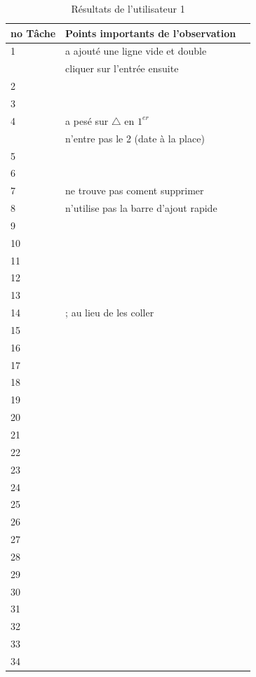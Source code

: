\documentclass[letterpaper, oneside, 12pt, these, creativecommons]{thETS}
\begin{document}
\begin{table}
	\centering
	\begin{tabular}{|l|l|l|}
	\hline
	no Tâche	& Points importants de l'observation	\\ \hline \hline
	1		& a ajouté une ligne vide et double	\\ 
			& cliquer sur l'entrée ensuite		\\ \hline
	2		& 						\\ \hline
	3		& 						\\ \hline
	4		& a pesé sur	$\bigtriangleup$ en $1^{er}$ \\
			& n'entre pas le 2 (date à la place)	\\ \hline
	5		& 						\\ \hline
	6		& 						\\ \hline
	7		& ne trouve pas coment supprimer	\\ \hline
	8		& n'utilise pas la barre d'ajout rapide	\\ \hline
	9		& 						\\ \hline
	10		& 						\\ \hline
	11		& 						\\ \hline
	12		& 						\\ \hline
	13		& 						\\ \hline
	14		& ; au lieu de les coller			\\ \hline
	15		& 						\\ \hline
	16		& 						\\ \hline
	17		& 						\\ \hline
	18		& 						\\ \hline
	19		& 						\\ \hline
	20		& 						\\ \hline
	21		& 						\\ \hline
	22		& 						\\ \hline
	23		& 						\\ \hline
	24		& 						\\ \hline
	25		& 						\\ \hline
	26		& 						\\ \hline
	27		& 						\\ \hline
	28		& 						\\ \hline
	29		& 						\\ \hline
	30		& 						\\ \hline
	31		& 						\\ \hline
	32		& 						\\ \hline
	33		& 						\\ \hline
	34		& 						\\ \hline
	\end{tabular}
	\caption{Résultats de l'utilisateur 1}
\end{table}
\end{document}
